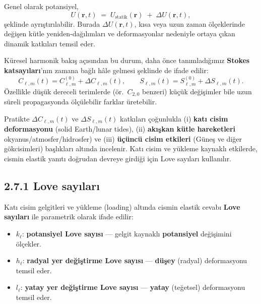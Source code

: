 Genel olarak potansiyel,
\begin{equation}
U(\mathbf{r},t) \;=\; U_{\text{statik}}(\mathbf{r}) \;+\; \Delta U(\mathbf{r},t),
\label{eq:U_static_plus_dynamic}
\end{equation}
şeklinde ayrıştırılabilir. Burada $\Delta U(\mathbf{r},t)$, kısa veya uzun zaman ölçeklerinde değişen
kütle yeniden-dağılımları ve deformasyonlar nedeniyle ortaya çıkan dinamik katkıları temsil eder.

Küresel harmonik bakış açısından bu durum, daha önce tanımladığımız \textbf{Stokes katsayıları}'nın  zamana bağlı hâle gelmesi şeklinde de ifade edilir:
\begin{equation}
C_{\ell,m}(t) = C_{\ell,m}^{(0)} + \Delta C_{\ell,m}(t),
\qquad
S_{\ell,m}(t) = S_{\ell,m}^{(0)} + \Delta S_{\ell,m}(t).
\label{eq:time_varying_coeffs}
\end{equation}
Özellikle düşük dereceli terimlerde (ör.\ $C_{2,0}$ benzeri) küçük değişimler bile uzun süreli propagasyonda
ölçülebilir farklar üretebilir.

Pratikte $\Delta C_{\ell,m}(t)$ ve $\Delta S_{\ell,m}(t)$ katkıları çoğunlukla (i) \textbf{katı cisim deformasyonu} (solid Earth/lunar tides), (ii) \textbf{akışkan kütle hareketleri} okyanus/atmosfer/hidrosfer) ve (iii) \textbf{üçüncü cisim etkileri} (Güneş ve diğer gökcisimleri) başlıkları altında incelenir. Katı cisim ve yükleme kaynaklı etkilerde, cismin elastik yanıtı doğrudan devreye girdiği için Love sayıları kullanılır.

\subsection*{2.7.1 \hspace{0.25em} Love sayıları}
\label{subsec:love_numbers}

Katı cisim gelgitleri ve yükleme (loading) altında cismin elastik cevabı \textbf{Love sayıları} ile parametrik olarak ifade edilir:
\begin{itemize}
    \item $k_{\ell}$: \textbf{potansiyel Love sayısı} --- gelgit kaynaklı \textbf{potansiyel} değişimini ölçekler.
    \item $h_{\ell}$: \textbf{radyal yer değiştirme Love sayısı} --- \textbf{düşey} (radyal) deformasyonu temsil eder.
    \item $l_{\ell}$: \textbf{yatay yer değiştirme Love sayısı} --- \textbf{yatay} (teğetsel) deformasyonu temsil eder.
\end{itemize}

